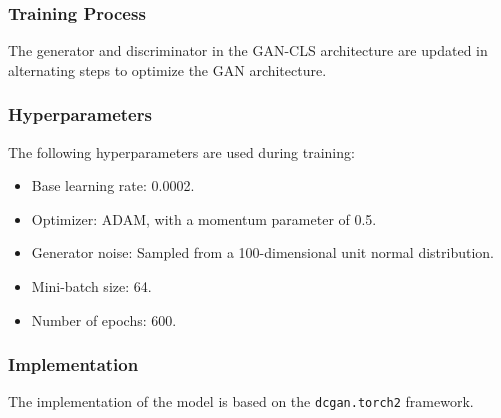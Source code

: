 \subsubsection*{Training Process}
The generator and discriminator in the GAN-CLS architecture are updated 
in alternating steps to optimize the GAN architecture.

\subsubsection*{Hyperparameters}
The following hyperparameters are used during training:
\begin{itemize}
    \item Base learning rate: 0.0002.
    \item Optimizer: ADAM, with a momentum parameter of 0.5.
    \item Generator noise: Sampled from a 100-dimensional unit normal distribution.
    \item Mini-batch size: 64.
    \item Number of epochs: 600.
\end{itemize}

\subsubsection*{Implementation}
The implementation of the model is based on the \texttt{dcgan.torch2} 
framework.
